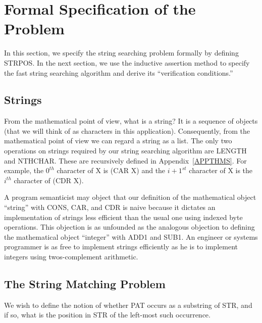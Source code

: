 \documentclass[10pt]{book}
\begin{document}
\section{Formal Specification of the Problem}
In this section, we specify the string searching problem formally
by defining STRPOS.
In the next section, we use the inductive assertion method to specify the
fast string searching algorithm and derive its ``verification
conditions.''

\subsection{Strings}
From the mathematical point of view, what is a string?  It is
a sequence of objects (that we will think of as characters in this
application).  Consequently, from the mathematical point of view we can
regard a string as a list.
The only two operations on strings required by
our string searching algorithm are LENGTH and NTHCHAR.  These are
recursively defined in Appendix~\ref{APPTHMS}.  For example, the $0^{th}$
character of X is (CAR X) and the $i+1^{st}$ character of X is
the $i^{th}$ character of (CDR X).

A program semanticist may object that our definition
of the mathematical object ``string'' with CONS, CAR, and CDR is
naive because it dictates an implementation of strings less
efficient than the usual one using indexed byte operations.
This objection is as unfounded as the analogous objection to defining
the mathematical object ``integer'' with ADD1 and SUB1.  An engineer
or systems programmer is as free to implement strings efficiently
as he is to implement integers using twos-complement arithmetic.

\subsection{The String Matching Problem}
We wish to define the notion of whether PAT occurs as a substring of STR,
and if so, what is the position in STR of the left-most such occurrence.
\end{document}
